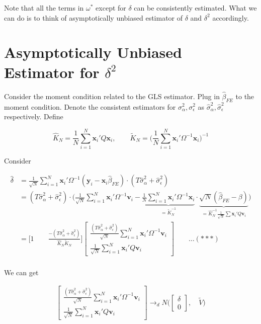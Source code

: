 \documentclass[12pt]{article}
\begin{document}
Note that all the terms in $\omega^{*}$ except for $\delta$ can be consistently estimated. What we can do is to think of asymptotically unbiased estimator of $\delta$ and $\delta^2$ accordingly.

\section*{Asymptotically Unbiased Estimator for $\delta^2$}

Consider the moment condition related to the GLS estimator. Plug in $\widehat{\beta}_{FE}$ to the moment condition. Denote the consistent estimators for $\sigma_\alpha^2, \sigma_\epsilon^2$ as $\widehat{\sigma}_\alpha^2, \widehat{\sigma}_\epsilon^2$ respectively. Define 

\[
\widehat{K}_N = \frac{1}{N} \sum_{i=1}^N \mathbf{x}_i' Q \mathbf{x}_i, \qquad \widetilde{K}_N = \bigg( \frac{1}{N}\sum_{i=1}^N \mathbf{x}_i' \Omega^{-1} \mathbf{x}_i \bigg)^{-1}
\]

Consider

\begin{align*}
\widehat{\delta} & = \frac{1}{\sqrt{N}} \sum_{i=1}^N \mathbf{x}_i' \Omega^{-1} (\mathbf{y}_i - \mathbf{x}_i \widehat{\beta}_{FE}) \cdot( T\widehat{\sigma}_\alpha^2 + \widehat{\sigma}_\epsilon^2)\\
&= (T\widehat{\sigma}_\alpha^2 + \widehat{\sigma}_\epsilon^2)\cdot \bigg (\frac{1}{\sqrt{N}} \sum_{i=1}^N \mathbf{x}_i' \Omega^{-1} \mathbf{v}_i - \underbrace{\frac{1}{N} \sum_{i=1}^N \mathbf{x}_i' \Omega^{-1} \mathbf{x}_i}_{= \widetilde{K}_N^{-1}} \cdot \underbrace{\sqrt{N}(\widehat{\beta}_{FE}-\beta)}_{=\widehat{K}_N^{-1} \frac{1}{\sqrt{N}}\sum \mathbf{x}_i' Q \mathbf{v}_i} \bigg)\\
&=  \bigg [1 \qquad \frac{-(T\widehat{\sigma}_\alpha^2 + \widehat{\sigma}_\epsilon^2)}{\widehat{K}_N\widetilde{K}_N} \bigg ]  \begin{bmatrix}
\frac{(T\widehat{\sigma}_\alpha^2 + \widehat{\sigma}_\epsilon^2)}{\sqrt{N}} \sum_{i=1}^N \mathbf{x}_i' \Omega^{-1} \mathbf{v}_i  \\
\frac{1}{\sqrt{N}} \sum_{i=1}^N \mathbf{x}_i' Q \mathbf{v}_i  
\end{bmatrix}  \qquad \ldots (***)\\
\end{align*}


We can get

\begin{align*}
  \begin{bmatrix}
\frac{(T\widehat{\sigma}_\alpha^2 + \widehat{\sigma}_\epsilon^2) }{\sqrt{N}} \sum_{i=1}^N \mathbf{x}_i' \Omega^{-1} \mathbf{v}_i  \\
\frac{1}{\sqrt{N}} \sum_{i=1}^N \mathbf{x}_i' Q \mathbf{v}_i  
\end{bmatrix} \rightarrow_d N\bigg( \begin{bmatrix}
\delta \\
0  
\end{bmatrix} , \quad  \widetilde{V}   \bigg)
\end{align*}
\end{document}
